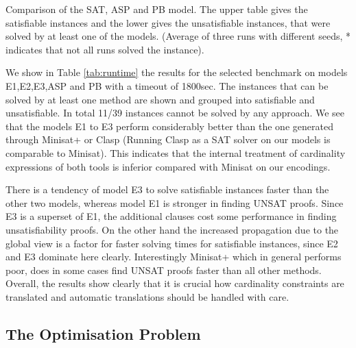\documentclass[]{llncs}
\begin{document}
\begin{table}[htbp]
    \caption{Comparison of the SAT, ASP and PB model. The upper table gives the satisfiable instances and the lower
    gives the unsatisfiable instances, that were solved by at least one of the models. (Average of three runs with
different seeds, * indicates that not all runs solved the instance).}
    \centering
    
    
    \label{tab:runtime}
\end{table}

We show in Table \ref{tab:runtime} the results for the selected benchmark on models E1,E2,E3,ASP and PB with a timeout
of 1800sec. The instances that can be solved by at least one method are shown and grouped into satisfiable and
unsatisfiable. In total 11/39 instances cannot be solved by any approach. We see that the models E1 to E3 perform
considerably better than the one generated through Minisat+ or Clasp (Running Clasp as a SAT solver on our models is
comparable to Minisat). This indicates that the internal treatment of cardinality expressions of both tools is inferior
compared with Minisat on our encodings. 

There is a tendency of model E3 to solve satisfiable instances faster than the other two models, whereas model E1 is
stronger in finding UNSAT proofs. Since E3 is a superset of E1, the additional clauses cost some performance  in finding
unsatisfiability proofs. On the other hand the increased propagation due to the global view is a factor for faster
solving times for satisfiable instances, since E2 and E3 dominate here clearly. Interestingly Minisat+ which in general
performs poor, does in some cases find UNSAT proofs faster than all other methods. Overall, the results show clearly
that it is crucial how cardinality constraints are translated and automatic translations should be handled with care. 

\subsection{The Optimisation Problem}
\end{document}
